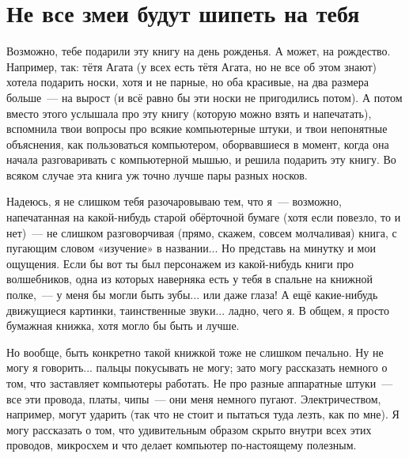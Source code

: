 
\chapter{Не все змеи будут шипеть на тебя}\label{ch:notallsnakeswillsquishyou}

Возможно, тебе подарили эту книгу на день рожденья. А может, на рождество. Например, так: тётя Агата (у всех есть тётя Агата, но не все об этом знают) хотела подарить носки, хотя и не парные, но оба красивые, на два размера больше — на вырост (и всё равно бы эти носки не пригодились потом). А потом вместо этого услышала про эту книгу (которую можно взять и напечатать), вспомнила твои вопросы про всякие компьютерные штуки, и твои непонятные объяснения, как пользоваться компьютером, оборвавшиеся в момент, когда она начала разговаривать с компьютерной мышью, и решила подарить эту книгу. Во всяком случае эта книга уж точно лучше пары разных носков.

Надеюсь, я не слишком тебя разочаровываю тем, что я — возможно, напечатанная на какой-нибудь старой обёрточной бумаге (хотя если повезло, то и нет) — не слишком разговорчивая (прямо, скажем, совсем молчаливая) книга, с пугающим словом «изучение» в названии... Но представь на минутку и мои ощущения. Если бы вот ты был персонажем из какой-нибудь книги про волшебников, одна из которых наверняка есть у тебя в спальне на книжной полке, — у меня бы могли быть зубы... или даже глаза! А ещё какие-нибудь движущиеся картинки, таинственные звуки... ладно, чего я. В общем, я просто бумажная книжка, хотя могло бы быть и лучше.


Но вообще, быть конкретно такой книжкой тоже не слишком печально. Ну не могу я говорить... пальцы покусывать не могу; зато могу рассказать немного о том, что заставляет компьютеры работать. Не про разные аппаратные штуки — все эти провода, платы, чипы — они меня немного пугают. Электричеством, например, могут ударить (так что не стоит и пытаться туда лезть, как по мне). Я могу рассказать о том, что удивительным образом скрыто внутри всех этих проводов, микросхем и что делает компьютер по-настоящему полезным.

